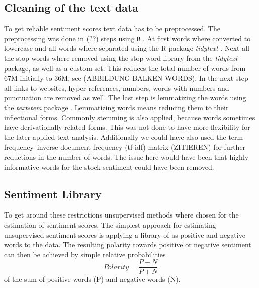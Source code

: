 \subsection{Cleaning of the text data}\label{cleaningText}
To get reliable sentiment scores text data has to be preprocessed. The preprocessing was done in (??) steps using \texttt{R} \citep{Rproject}. At first words where converted to lowercase and all words where separated using the R package \textit{tidytext} \citep{tidytext}. Next all the stop words where removed using the stop word library from the \textit{tidytext} package, as well as a custom set. This reduces the total number of words from 67M initially to 36M, see (ABBILDUNG BALKEN WORDS). In the next step all links to websites, hyper-references, numbers, words with numbers and punctuation are removed as well. 
The last step is lemmatizing the words using the \textit{textstem} package \citep{textstem}. Lemmatizing words means reducing them to their inflectional forms. Commonly stemming is also applied, because words sometimes have derivationally related forms. This was not done to have more flexibility for the later applied text analysis. Additionally we could have also used the term frequency–inverse document frequency (tf-idf) matrix (ZITIEREN) for further reductions in the number of words. The issue here would have been that highly informative words for the stock sentiment could have been removed. 





\subsection{Sentiment Library}\label{BoW}
To get around these restrictions unsupervised methods where chosen for the estimation of sentiment scores. 
The simplest approach for estimating unsupervised sentiment scores is applying a library of as positive and negative words to the data. The resulting polarity towards positive or negative sentiment can then be achieved by simple relative probabilities
\begin{equation}
    Polarity = \frac{P - N}{P + N}
\end{equation}
of the sum of positive words (P) and negative words (N). 

